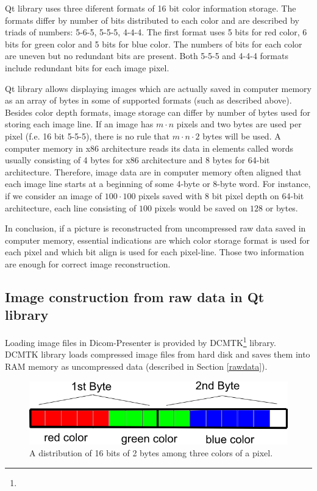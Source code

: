 Qt library uses three diferent formats of 16 bit color information storage. The formats differ by number of bits distributed to each color and are described by triads of numbers: 5-6-5, 5-5-5, 4-4-4. The first format uses 5 bits for red color, 6 bits for green color and 5 bits for blue color. The numbers of bits for each color are uneven but no redundant bits are present. Both 5-5-5 and 4-4-4 formats include redundant bits for each image pixel.

Qt library allows displaying images which are actually saved in computer memory as an array of bytes in some of supported formats (such as described above). Besides color depth formats, image storage can differ by number of bytes used for storing each image line. If an image has $m \cdot n$ pixels and two bytes are used per pixel (f.e. 16 bit 5-5-5), there is no rule that $m \cdot n \cdot 2$ bytes will be used. A computer memory in x86 architecture reads its data in elements called words usually consisting of 4 bytes for x86 architecture and 8 bytes for 64-bit architecture. Therefore, image data are in computer memory often aligned that each image line starts at a beginning of some 4-byte or 8-byte word. For instance, if we consider an image of $100 \cdot 100$ pixels saved with 8 bit pixel depth on 64-bit architecture, each line consisting of $100$ pixels would be saved on $128$ or bytes.

In conclusion, if a picture is reconstructed from uncompressed raw data saved in computer memory, essential indications are which color storage format is used for each pixel and which bit align is used for each pixel-line. Those two information are enough for correct image reconstruction.

\subsection{Image construction from raw data in Qt library}

Loading image files in Dicom-Presenter is provided by DCMTK\footnote{} library. DCMTK library loads compressed image files from hard disk and saves them into RAM memory as uncompressed data (described in Section \ref{rawdata}). 

\begin{figure}
	\begin{center}
	\includegraphics[width=130mm]{Text/IMG/ImageStoring_16bit.png}
	\end{center}
	\caption{A distribution of 16 bits of 2 bytes among three colors of a pixel.}
	\label{screenshot}
\end{figure}

